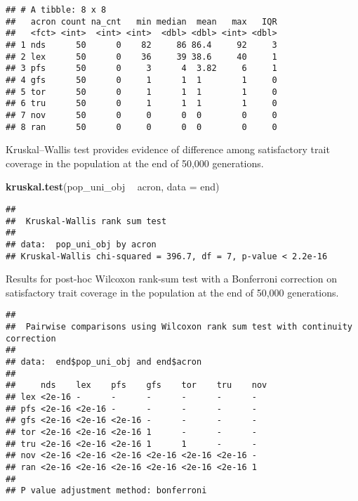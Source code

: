 \documentclass[]{book}
\newenvironment{Shaded}{\begin{snugshade}}{\end{snugshade}}
\newcommand{\DataTypeTok}[1]{\textcolor[rgb]{0.13,0.29,0.53}{#1}}
\newcommand{\KeywordTok}[1]{\textcolor[rgb]{0.13,0.29,0.53}{\textbf{#1}}}
\newcommand{\NormalTok}[1]{#1}
\newcommand{\OperatorTok}[1]{\textcolor[rgb]{0.81,0.36,0.00}{\textbf{#1}}}
\newcommand{\OtherTok}[1]{\textcolor[rgb]{0.56,0.35,0.01}{#1}}
\newcommand{\StringTok}[1]{\textcolor[rgb]{0.31,0.60,0.02}{#1}}
\begin{document}
\begin{verbatim}
## # A tibble: 8 x 8
##   acron count na_cnt   min median  mean   max   IQR
##   <fct> <int>  <int> <int>  <dbl> <dbl> <int> <dbl>
## 1 nds      50      0    82     86 86.4     92     3
## 2 lex      50      0    36     39 38.6     40     1
## 3 pfs      50      0     3      4  3.82     6     1
## 4 gfs      50      0     1      1  1        1     0
## 5 tor      50      0     1      1  1        1     0
## 6 tru      50      0     1      1  1        1     0
## 7 nov      50      0     0      0  0        0     0
## 8 ran      50      0     0      0  0        0     0
\end{verbatim}

Kruskal--Wallis test provides evidence of difference among satisfactory trait coverage in the population at the end of 50,000 generations.

\begin{Shaded}
\begin{Highlighting}[]
\KeywordTok{kruskal.test}\NormalTok{(pop_uni_obj }\OperatorTok{~}\StringTok{ }\NormalTok{acron, }\DataTypeTok{data =}\NormalTok{ end)}
\end{Highlighting}
\end{Shaded}

\begin{verbatim}
## 
##  Kruskal-Wallis rank sum test
## 
## data:  pop_uni_obj by acron
## Kruskal-Wallis chi-squared = 396.7, df = 7, p-value < 2.2e-16
\end{verbatim}

Results for post-hoc Wilcoxon rank-sum test with a Bonferroni correction on satisfactory trait coverage in the population at the end of 50,000 generations.

\begin{Shaded}
\end{Shaded}

\begin{verbatim}
## 
##  Pairwise comparisons using Wilcoxon rank sum test with continuity correction 
## 
## data:  end$pop_uni_obj and end$acron 
## 
##     nds    lex    pfs    gfs    tor    tru    nov
## lex <2e-16 -      -      -      -      -      -  
## pfs <2e-16 <2e-16 -      -      -      -      -  
## gfs <2e-16 <2e-16 <2e-16 -      -      -      -  
## tor <2e-16 <2e-16 <2e-16 1      -      -      -  
## tru <2e-16 <2e-16 <2e-16 1      1      -      -  
## nov <2e-16 <2e-16 <2e-16 <2e-16 <2e-16 <2e-16 -  
## ran <2e-16 <2e-16 <2e-16 <2e-16 <2e-16 <2e-16 1  
## 
## P value adjustment method: bonferroni
\end{verbatim}
\end{document}
